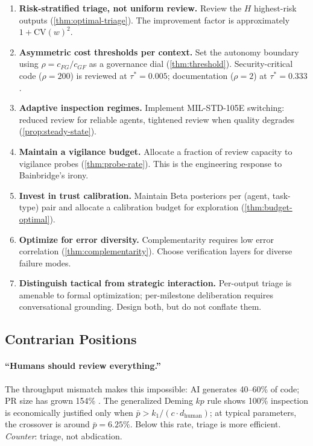 \begin{enumerate}[leftmargin=*,nosep]
\item \textbf{Risk-stratified triage, not uniform review.} Review the $H$ highest-risk outputs (\ref{thm:optimal-triage}). The improvement factor is approximately $1 + \text{CV}(w)^2$.

\item \textbf{Asymmetric cost thresholds per context.} Set the autonomy boundary using $\rho = c_{FG}/c_{GF}$ as a governance dial (\ref{thm:threshold}). Security-critical code ($\rho = 200$) is reviewed at $\tau^* = 0.005$; documentation ($\rho = 2$) at $\tau^* = 0.333$.

\item \textbf{Adaptive inspection regimes.} Implement MIL-STD-105E switching: reduced review for reliable agents, tightened review when quality degrades (\ref{prop:steady-state}).

\item \textbf{Maintain a vigilance budget.} Allocate a fraction of review capacity to vigilance probes (\ref{thm:probe-rate}). This is the engineering response to Bainbridge's irony.

\item \textbf{Invest in trust calibration.} Maintain Beta posteriors per (agent, task-type) pair and allocate a calibration budget for exploration (\ref{thm:budget-optimal}).

\item \textbf{Optimize for error diversity.} Complementarity requires low error correlation (\ref{thm:complementarity}). Choose verification layers for diverse failure modes.

\item \textbf{Distinguish tactical from strategic interaction.} Per-output triage is amenable to formal optimization; per-milestone deliberation requires conversational grounding. Design both, but do not conflate them.
\end{enumerate}

\subsection{Contrarian Positions}

\paragraph{``Humans should review everything.''} The throughput mismatch makes this impossible: AI generates 40--60\% of code; PR size has grown 154\% \citep{dora2025}. The generalized Deming $kp$ rule shows 100\% inspection is economically justified only when $\bar{p} > k_1/(c \cdot d_{\text{human}})$; at typical parameters, the crossover is around $\bar{p} = 6.25\%$. Below this rate, triage is more efficient. \emph{Counter}: triage, not abdication.

